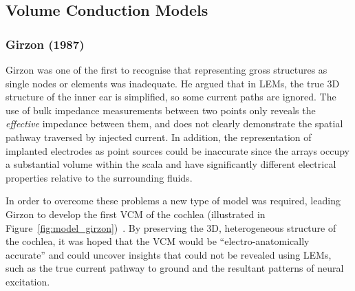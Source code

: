 \subsection{Volume Conduction Models}
\label{sect:volume_conduction_models}

\subsubsection{Girzon (1987)}

Girzon was one of the first to recognise that representing gross structures as
single nodes or elements was inadequate. He argued that in LEMs, the true 3D
structure of the inner ear is simplified, so some current paths are ignored. The
use of bulk impedance measurements between two points only reveals the
\emph{effective} impedance between them, and does not clearly demonstrate the
spatial pathway traversed by injected current. In addition, the representation
of implanted electrodes as point sources could be inaccurate since the arrays
occupy a substantial volume within the scala and have significantly different
electrical properties relative to the surrounding fluids.

In order to overcome these problems a new type of model was required, leading
Girzon to develop the first VCM of the cochlea (illustrated in
Figure~\ref{fig:model_girzon})~\cite{girzon1987}. By preserving the 3D,
heterogeneous structure of the cochlea, it was hoped that the VCM would be
``electro-anatomically accurate'' and could uncover insights that could not be
revealed using LEMs, such as the true current pathway to ground and the
resultant patterns of neural excitation.


